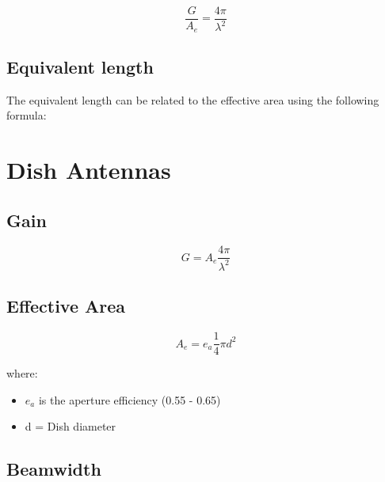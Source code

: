 \begin{equation}
	\frac{G}{A_e}=\frac{4 \pi }{\lambda^2}
\end{equation}



\subsection{Equivalent length} %
\label{sub:equivalent_length}

The equivalent length can be related to the effective area using the following formula:







\section{Dish Antennas} %
\label{sec:dish_antennas}

\subsection{Gain} %
\label{sub:gain}

\begin{equation}
	G=A_e\frac{4 \pi}{\lambda^2}
\end{equation}




\subsection{Effective Area} %
\label{sub:effective_area}



\begin{equation}
	A_e = e_a \frac{1}{4} \pi d^2
\end{equation}

where:

\begin{itemize}
	\item $e_a$ is the aperture efficiency (0.55 - 0.65) 
	\item d = Dish diameter
\end{itemize}




\subsection{Beamwidth} %
\label{sub:beamwidth}

